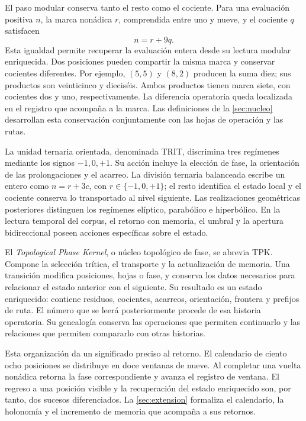El paso modular conserva tanto el resto como el cociente. Para una
evaluación positiva \(n\), la marca nonádica \(r\), comprendida entre
uno y nueve, y el cociente \(q\) satisfacen
\[
 n=r+9q.
\]
Esta igualdad permite recuperar la evaluación entera desde su lectura
modular enriquecida. Dos posiciones pueden compartir la misma marca y
conservar cocientes diferentes. Por ejemplo, \((5,5)\) y \((8,2)\)
producen la suma diez; sus productos son veinticinco y dieciséis. Ambos
productos tienen marca siete, con cocientes dos y uno, respectivamente.
La diferencia operatoria queda localizada en el registro que acompaña a
la marca. Las definiciones de la \cref{sec:nucleo} desarrollan esta
conservación conjuntamente con las hojas de operación y las rutas.

La unidad ternaria orientada, denominada TRIT, discrimina tres regímenes
mediante los signos \(-1,0,+1\). Su acción incluye la elección de fase,
la orientación de las prolongaciones y el acarreo. La división ternaria
balanceada escribe un entero como \(n=r+3c\), con
\(r\in\{-1,0,+1\}\); el resto identifica el estado local y el
cociente conserva lo transportado al nivel siguiente. Las realizaciones
geométricas posteriores distinguen los regímenes elíptico, parabólico e
hiperbólico. En la lectura temporal del corpus, el retorno con memoria,
el umbral y la apertura bidireccional poseen acciones específicas sobre
el estado.

El \emph{Topological Phase Kernel}, o núcleo topológico de fase, se
abrevia TPK. Compone la selección trítica, el transporte y la
actualización de memoria. Una transición modifica posiciones, hojas o
fase, y conserva los datos necesarios para relacionar el estado anterior
con el siguiente. Su resultado es un estado enriquecido: contiene
residuos, cocientes, acarreos, orientación, frontera y prefijos de ruta.
El número que se leerá posteriormente procede de esa historia
operatoria. Su genealogía conserva las operaciones que permiten
continuarlo y las relaciones que permiten compararlo con otras
historias.

Esta organización da un significado preciso al retorno. El calendario
de ciento ocho posiciones se distribuye en doce ventanas de nueve. Al
completar una vuelta nonádica retorna la fase correspondiente y avanza
el registro de ventana. El regreso a una posición visible y la
recuperación del estado enriquecido son, por tanto, dos sucesos
diferenciados. La \cref{sec:extension} formaliza el calendario, la
holonomía y el incremento de memoria que acompaña a sus retornos.

